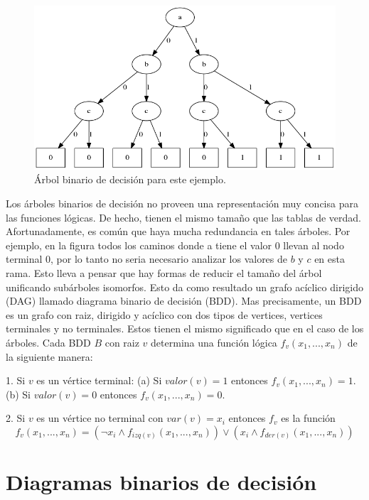 \begin{figure}[h]
  \centering
  \includegraphics[width=1\textwidth]{Figures/BDT.png}
  \caption{Árbol binario de decisión para este ejemplo.}
  \label{fig:bdt1}
\end{figure}

Los árboles binarios de decisión no proveen una representación muy concisa para las funciones lógicas. De hecho, tienen el mismo tamaño que las tablas de verdad. Afortunadamente, es común que haya mucha redundancia en tales árboles. Por ejemplo, en la figura \label{fig:bdt1} todos los caminos donde a tiene el valor 0 llevan al nodo terminal 0, por lo tanto no seria necesario analizar los valores de $b$ y $c$ en esta rama. Esto lleva a pensar que hay formas de reducir el tamaño del árbol unificando subárboles isomorfos. Esto da como resultado un grafo acíclico dirigido (DAG) llamado diagrama binario de decisión (BDD). Mas precisamente, un BDD es un grafo con raiz, dirigido y acíclico con dos tipos de vertices, vertices terminales y no terminales. Estos tienen el mismo significado que en el caso de los árboles. Cada BDD $B$ con raiz $v$ determina una función lógica $f_{v}(x_{1},...,x_{n})$ de la siguiente manera:

1. Si $v$ es un vértice terminal:
  (a) Si $valor(v) = 1$ entonces $f_{v}(x_{1},...,x_{n}) = 1$.
  (b) Si $valor(v) = 0$ entonces $f_{v}(x_{1},...,x_{n}) = 0$.

2. Si $v$ es un vértice no terminal con $var(v) = x_{i}$ entonces $f_{v}$ es la función 
\[f_{v}(x_{1},...,x_{n}) = (\neg x_{i} \land f_{izq(v)}(x_{1},...,x_{n})) \lor (x_{i} \land f_{der(v)}(x_{1},...,x_{n}))\]



\section{Diagramas binarios de decisión}



